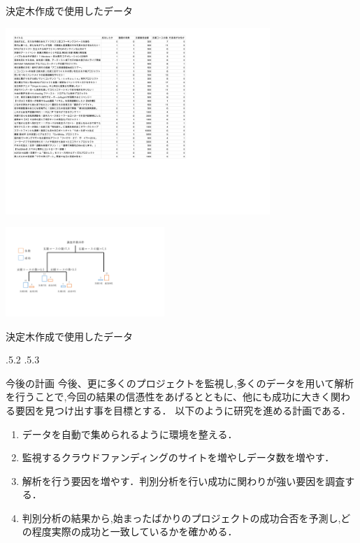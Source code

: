 \documentclass[uplatex]{jsarticle}
\makeatletter
\renewcommand{\section}{%
    \if@slide\clearpage\fi
    \@startsection{section}{1}{\z@}%
    {\Cvs \@plus.5\Cdp \@minus.2\Cdp}%
    {.5\Cvs \@plus.3\Cdp}%
    {\normalfont\raggedright}}
\makeatother
\begin{document}
\makeatletter
\def\setcaption#1{\def\@captype{#1}}
\makeatother

\begin{center}

\begin{minipage}{10cm}
  \setcaption{figure}
\caption{決定木作成で使用したデータ}\label{サンプル図}
\includegraphics[width=10cm,clip]{figure2.pdf}
\end{minipage}
\begin{minipage}{6cm}
  \setcaption{table}
\includegraphics[width=6cm,clip]{figure.pdf}
 \caption{決定木作成で使用したデータ}\label{サンプル図}  
\end{minipage}
\end{center}


\section{今後の計画}
今後、更に多くのプロジェクトを監視し,多くのデータを用いて解析を行うことで,今回の結果の信憑性をあげるとともに、他にも成功に大きく関わる要因を見つけ出す事を目標とする．
以下のように研究を進める計画である．

\begin{enumerate}
\item データを自動で集められるように環境を整える．
\item 監視するクラウドファンディングのサイトを増やしデータ数を増やす．
\item 解析を行う要因を増やす．判別分析を行い成功に関わりが強い要因を調査する．
\item 判別分析の結果から,始まったばかりのプロジェクトの成功合否を予測し,どの程度実際の成功と一致しているかを確かめる．
\end{enumerate}



\end{document}
